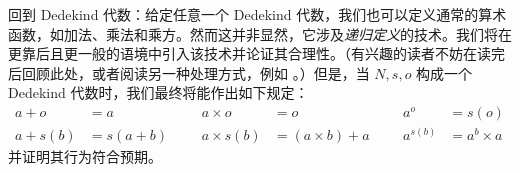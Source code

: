 \documentclass[../../../include/open-logic-section]{subfiles}
\begin{document}
回到 Dedekind 代数：给定任意一个 Dedekind 代数，我们也可以定义通常的算术函数，如加法、乘法和乘方。然而这并非显然，它涉及\emph{递归定义}的技术。我们将在更靠后且更一般的语境中引入该技术并论证其合理性。（有兴趣的读者不妨在读完  后回顾此处，或者阅读另一种处理方式，例如 \citealt[pp.~95--8]{Potter2004}。）但是，当 $N, s, o$ 构成一个 Dedekind 代数时，我们最终将能作出如下规定：
\begin{align*}
	{a} + {o} &= {a} & & & {a} \times {o} &= {o} & & & {a}^{o} &= s(o)\\
{a} + {s}({b}) &= {s}({a}+{b}) &&& {a} \times {s}({b}) &= ({a}\times {b}) + {a}  & & & {a}^{{s}({b})} &= {a}^{b} \times {a}
\end{align*}
并证明其行为符合预期。
\end{document}

